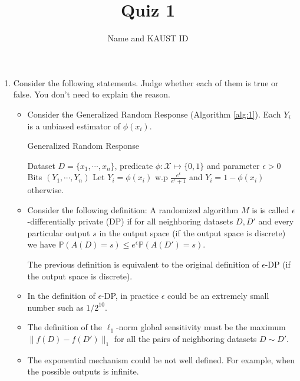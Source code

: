 \documentclass[11pt]{article}
\begin{document}
\author{Name and KAUST ID}
\title{Quiz 1}
\maketitle

\medskip

\begin{enumerate}

\item Consider the following statements. Judge whether each of them is true or false. You don’t need to explain the reason.

\begin{itemize}
	
	\item 

Consider the Generalized Random Response (Algorithm \ref{alg:1}). Each $Y_i$ is a unbiased estimator of $\phi(x_i)$. 

	\begin{algorithm}[!htbp]
    \caption{Generalized Random Response} 
    \label{alg:1}
    \begin{algorithmic}[1]
        \Require Dataset $D=\{x_1,\cdots, x_n\}$, predicate $\phi: \mathcal{X}\mapsto \{0, 1\}$ and parameter $\epsilon>0$
        \Ensure Bits $(Y_1, \cdots, Y_n)$
        \State Let $Y_i=\phi(x_i)$ w.p $\frac{e^\epsilon}{e^\epsilon+1}$ and $Y_i=1-\phi(x_i)$ otherwise. 
        \EndFor
    \end{algorithmic}
\end{algorithm}
\item Consider the following definition: A randomized algorithm $M$ is is called $\epsilon$-differentially private (DP) if for all neighboring datasets $D, D'$ and every particular output $s$ in the output space (if the output space is discrete) we have $\mathbb{P}(A(D)=s)\leq e^\epsilon \mathbb{P}(A(D')=s)$.
   
   The previous definition is equivalent to the original definition of $\epsilon$-DP (if the output space is discrete). 
\item In the definition of $\epsilon$-DP, in practice $\epsilon$ could be an extremely small number such as $1/2^{10}$. 
\item The definition of the $\ell_1$-norm global sensitivity must be the maximum $\|f(D)-f(D')\|_1$ for all the pairs of neighboring datasets $D\sim D'$. 
\item The exponential mechanism could be not well defined. For example, when the possible outputs is infinite. 
\end{itemize}
 

\end{enumerate}
\end{document}
